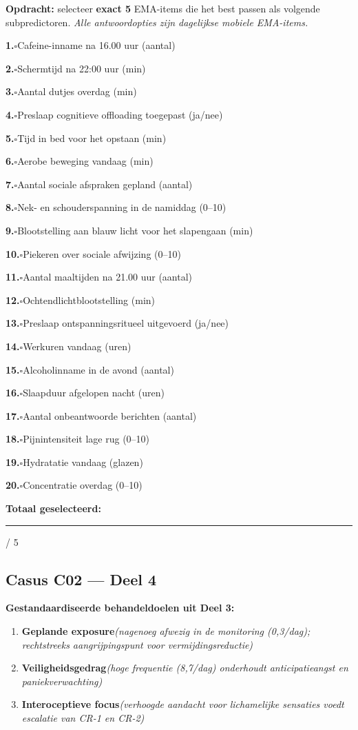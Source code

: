 \documentclass[11pt,a4paper]{article}
\newcommand{\checkitemBFS}[2]{%
\noindent\small\textbf{#1.}\hspace{0.45em}$\square$\hspace{0.4em}#2\par\vspace{0.20em}}
\begin{document}
\begin{responsebox}
\small\textbf{Opdracht:} selecteer \textbf{exact 5} EMA-items die het best passen als volgende subpredictoren.
\textit{Alle antwoordopties zijn dagelijkse mobiele EMA-items.}

\checkitemBFS{1}{Cafeine-inname na 16.00 uur (aantal)}
\checkitemBFS{2}{Schermtijd na 22:00 uur (min)}
\checkitemBFS{3}{Aantal dutjes overdag (min)}
\checkitemBFS{4}{Preslaap cognitieve offloading toegepast (ja/nee)}
\checkitemBFS{5}{Tijd in bed voor het opstaan (min)}
\checkitemBFS{6}{Aerobe beweging vandaag (min)}
\checkitemBFS{7}{Aantal sociale afspraken gepland (aantal)}
\checkitemBFS{8}{Nek- en schouderspanning in de namiddag (0--10)}
\checkitemBFS{9}{Blootstelling aan blauw licht voor het slapengaan (min)}
\checkitemBFS{10}{Piekeren over sociale afwijzing (0--10)}
\checkitemBFS{11}{Aantal maaltijden na 21.00 uur (aantal)}
\checkitemBFS{12}{Ochtendlichtblootstelling (min)}
\checkitemBFS{13}{Preslaap ontspanningsritueel uitgevoerd (ja/nee)}
\checkitemBFS{14}{Werkuren vandaag (uren)}
\checkitemBFS{15}{Alcoholinname in de avond (aantal)}
\checkitemBFS{16}{Slaapduur afgelopen nacht (uren)}
\checkitemBFS{17}{Aantal onbeantwoorde berichten (aantal)}
\checkitemBFS{18}{Pijnintensiteit lage rug (0--10)}
\checkitemBFS{19}{Hydratatie vandaag (glazen)}
\checkitemBFS{20}{Concentratie overdag (0--10)}
\vspace{0.4em}
\noindent\textbf{Totaal geselecteerd:}\hspace{0.5em}\rule{1.2cm}{0.25pt}\hspace{0.2em}/ 5
\end{responsebox}

\vspace{0.6em}
\newpage
\subsection*{Casus C02 --- Deel 4}

\begin{contextbox}
\small\textbf{Gestandaardiseerde behandeldoelen uit Deel 3:}
\begin{enumerate}[topsep=2pt,itemsep=1pt,label=\arabic*.]
\item \textbf{Geplande exposure}\quad\textit{\small (nagenoeg afwezig in de monitoring (0,3/dag); rechtstreeks aangrijpingspunt voor vermijdingsreductie)}
\item \textbf{Veiligheidsgedrag}\quad\textit{\small (hoge frequentie (8,7/dag) onderhoudt anticipatieangst en paniekverwachting)}
\item \textbf{Interoceptieve focus}\quad\textit{\small (verhoogde aandacht voor lichamelijke sensaties voedt escalatie van CR-1 en CR-2)}
\end{enumerate}
\end{contextbox}
\end{document}
